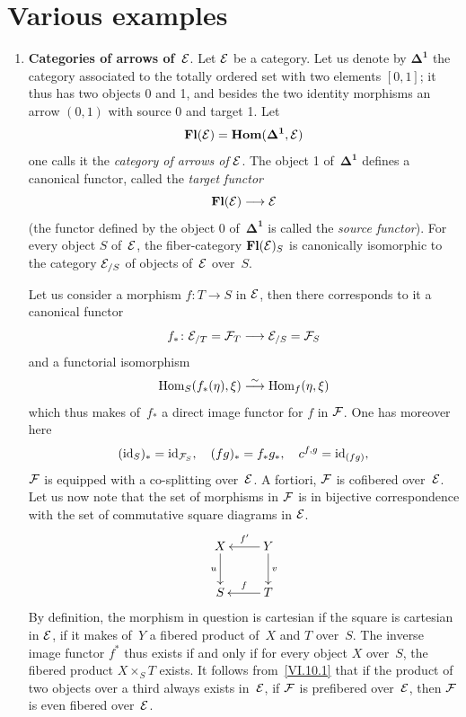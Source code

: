 \section{Various examples}
\label{VI.11}

\begin{enumerate}

\item[a)] \textbf{Categories of arrows of}~$\cal{E}$. Let
$\cal{E}$ be a category. Let us denote by $\mathbf{\Delta^1}$ the
category associated to the totally ordered set
with two elements $[0,1]$;
it thus has two objects 0 and 1, and besides the two identity
morphisms an arrow $(0,1)$ with source 0 and target 1. Let
$$
\CatFl(\cal{E})=\SheafHom(\mathbf{\Delta^1},\cal{E})
$$
one calls it the \emph{category of arrows of} $\cal{E}$.
The object 1 of~$\mathbf{\Delta^1}$ defines a canonical functor,
called the \emph{target functor}
$$
\CatFl(\cal{E})\to \cal{E}
$$
(the functor defined by the object 0 of~$\mathbf{\Delta^1}$ is
called the \emph{source functor}). For every object $S$ of~$\cal{E}$,
the fiber-category $\CatFl(\cal{E})_S$ is canonically isomorphic
to the category $\cal{E}_{/S}$ of objects of~$\cal{E}$
over~$S$.

Let us consider a morphism $f\colon T\to S$ in $\cal{E}$, then there
corresponds to it a canonical functor
$$
f_*\colon \cal{E}_{/T}=\cal{F}_T\to \cal{E}_{/S}=\cal{F}_S
$$
and a functorial isomorphism
$$
\Hom_S(f_*(\eta),\xi)\isomto\Hom_f(\eta,\xi)
$$
which thus makes of~$f_*$ a direct image functor for $f$ in
$\cal{F}$. One has moreover here
$$
(\id_S)_*=\id_{\cal{F}_S},\quad (fg)_*=f_*g_*,\quad
c^{f,g}=\id_{(fg)},
$$
\ie $\cal{F}$ is equipped with a co-splitting over~$\cal{E}$. A fortiori,
$\cal{F}$ is cofibered over~$\cal{E}$. Let us now note that
the set of morphisms in $\cal{F}$ is in bijective
correspondence with the set of commutative square diagrams in
$\cal{E}$.
$$
\xymatrix{
X\ar[d]_-u&\ar[l]_-{f'}Y\ar[d]^-v\\
S&\ar[l]_-{f}T
}
$$
By
definition, the morphism in question is cartesian if the
square is cartesian in $\cal{E}$, \ie if it makes of~$Y$ a
fibered product of~$X$ and $T$ over~$S$. The inverse image functor
$f^*$
thus exists if and only if for every object $X$ over~$S$, the fibered
product $X\times_ST$ exists. It follows from~\ref{VI.10.1} that if
the product of two objects over a third always exists in~$\cal{E}$, \ie if $\cal{F}$ is prefibered over~$\cal{E}$,
then $\cal{F}$ is even fibered over~$\cal{E}$.


\end{enumerate}
